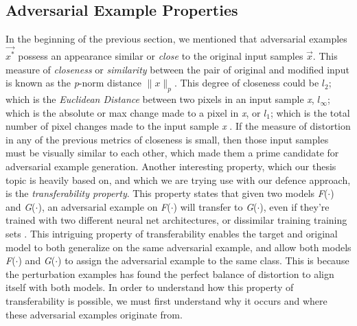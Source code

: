 \documentclass[grad,lot,lof,11pt,oneside,onehalfspace]{RUthesis}
\begin{document}
\subsection{Adversarial Example Properties}
In the beginning of the previous section, we mentioned that adversarial examples $\vec{x^{*}}$ possess an appearance similar or \textit{close} to the original input samples \textit{$\vec{x}$}. This measure of \textit{closeness} or \textit{similarity} between the pair of original and modified input is known as the \textit{p}-norm distance $\parallel x \parallel_{p}$. This degree of closeness could be $l_{2}$; which is the \textit{Euclidean Distance}  between two pixels in an input sample \textit{x}, $l_{\infty}$; which is the absolute or max change made to a pixel in \textit{x}, or $l_{1}$; which is the total number of pixel changes made to the input sample \textit{x} \cite{carlini_adversarial_2017}. If the measure of distortion in any of the previous metrics of closeness is small, then those input samples must be visually similar to each other, which made them a prime candidate for adversarial example generation. Another interesting property, which our thesis topic is heavily based on, and which we are trying use  with our defence approach, is the \textit{transferability property}. This property states that given two models \textit{F}($\cdot$) and \textit{G}($\cdot$), an adversarial example on \textit{F}($\cdot$) will transfer to \textit{G}($\cdot$), even if they're trained with two different neural net architectures, or dissimilar training training sets \cite{carlini_adversarial_2017}. This intriguing property of transferability enables the target and original model to both generalize on the same adversarial example, and allow both models \textit{F}($\cdot$) and \textit{G}($\cdot$) to assign the adversarial example to the same class. This is because the perturbation examples has found the perfect balance of distortion to align itself with both models.  In order to understand how this property of transferability is possible, we must first understand why it occurs and where these adversarial examples originate from. 
\end{document}
